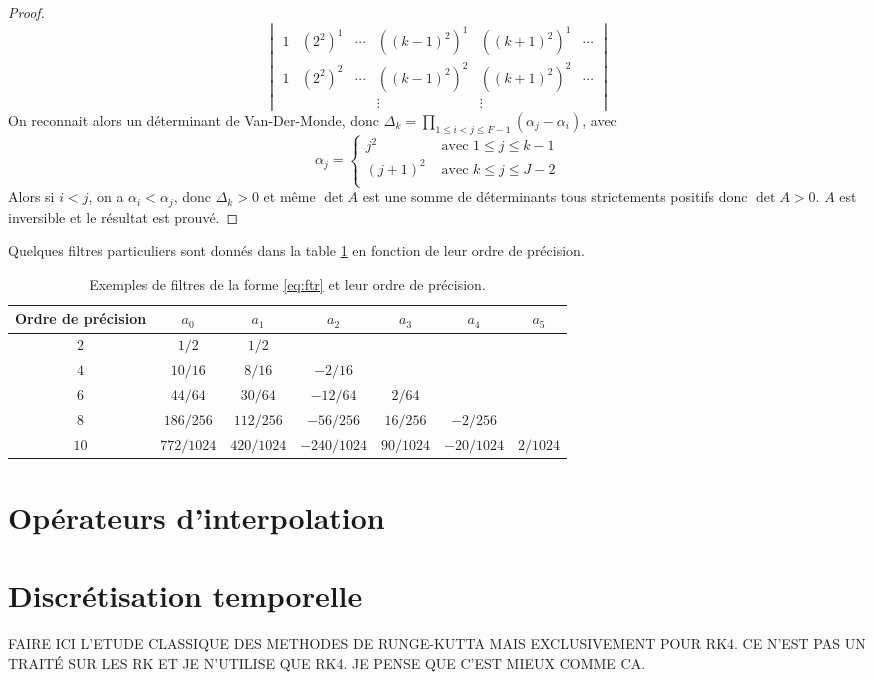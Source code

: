 \begin{proof}
\begin{equation}
\begin{vmatrix}
1 & (2^2)^1 & \cdots & ((k-1)^2)^1 & ((k+1)^2)^1 & \cdots\\
1 & (2^2)^2 & \cdots & ((k-1)^2)^2 & ((k+1)^2)^2 & \cdots\\
&&& \vdots &  \vdots &
\end{vmatrix}
\end{equation}
On reconnait alors un déterminant de Van-Der-Monde, donc $\Delta_k = \prod_{1 \leq i < j \leq F-1} \left( \alpha_j - \alpha_i \right)$, avec 
\begin{equation}
\alpha_j = \left\lbrace
\begin{array}{ll}
j^2 & \text{ avec } 1 \leq j \leq k-1\\
(j+1)^2 & \text{ avec } k \leq j \leq J-2\\
\end{array}
\right.
\end{equation}
Alors si $i<j$, on a $\alpha_i < \alpha_j$, donc $\Delta_k>0$ et même $\det A$ est une somme de déterminants tous strictements positifs donc $\det A > 0$. $A$ est inversible et le résultat est prouvé.
\end{proof}
Quelques filtres particuliers sont donnés dans la table \ref{tab:filter} en fonction de leur ordre de précision.

\begin{table}[htbp]
\begin{center}
\begin{tabular}{|c||cccccc|}
\hline
\textbf{Ordre de précision} & $a_0$ & $a_1$ & $a_2$ & $a_3$ & $a_4$ & $a_5$ \\
\hline \hline
$2$ & $1/2$ & $1/2$ & & & & \\
\hline
$4$ & $10/16$ & $8/16$ & $-2/16$ & & & \\
\hline
$6$ & $44/64$ & $30/64$ & $-12/64$ & $2/64$ & & \\
\hline
$8$ & $186/256$ & $112/256$ & $-56/256$ & $16/256$ & $-2/256$ & \\
\hline
$10$ & $772/1024$ & $420/1024$ & $-240/1024$ & $90/1024$ & $-20/1024$ & $2/1024$ \\
\hline
\end{tabular}
\end{center}
\caption{Exemples de filtres de la forme \eqref{eq:ftr} et leur ordre de précision.}
\label{tab:filter}
\end{table}
















\section{Opérateurs d'interpolation}


\section{Discrétisation temporelle}


FAIRE ICI L'ETUDE CLASSIQUE DES METHODES DE RUNGE-KUTTA MAIS EXCLUSIVEMENT POUR RK4.
CE N'EST PAS UN TRAITÉ SUR LES RK ET JE N'UTILISE QUE RK4.
JE PENSE QUE C'EST MIEUX COMME CA.
